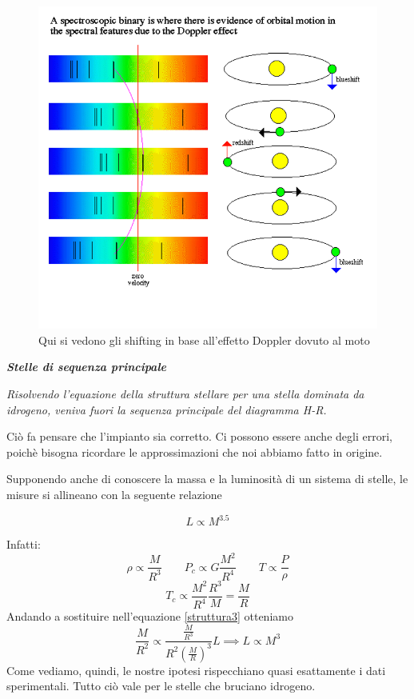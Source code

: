 \documentclass[a4paper,11pt]{article}
\begin{document}
\begin{figure}[H]
    \centering
    \includegraphics[scale=0.3]{doppler.png}
    \caption{Qui si vedono gli shifting in base all'effetto Doppler dovuto al moto}
\end{figure}

\textit{\textbf{Stelle di sequenza principale}}

\textit{Risolvendo l'equazione della struttura stellare per una stella dominata da idrogeno, veniva fuori la sequenza principale del diagramma H-R.}

Ciò fa pensare che l'impianto sia corretto. Ci possono essere anche degli errori, poichè bisogna ricordare le approssimazioni che noi abbiamo fatto in origine.

Supponendo anche di conoscere la massa e la luminosità di un sistema di stelle, le misure si allineano con la seguente relazione

$$L\propto M^{3.5}$$

Infatti:
$$\rho\propto \frac{M}{R^3}\qquad P_c\propto G\frac{M^2}{R^4}\qquad T\propto \frac{P}{\rho}$$
$$T_c\propto \frac{M^2}{R^4}\frac{R^3}{M}=\frac{M}{R}$$
Andando a sostituire nell'equazione \ref{struttura3} otteniamo
$$\frac{M}{R^2}\propto \frac{\frac{M}{R^3}}{R^2\left(\frac{M}{R}\right)^3}L\implies L\propto M^3$$
Come vediamo, quindi, le nostre ipotesi rispecchiano quasi esattamente i dati sperimentali. Tutto ciò vale per le stelle che bruciano idrogeno.
\end{document}
